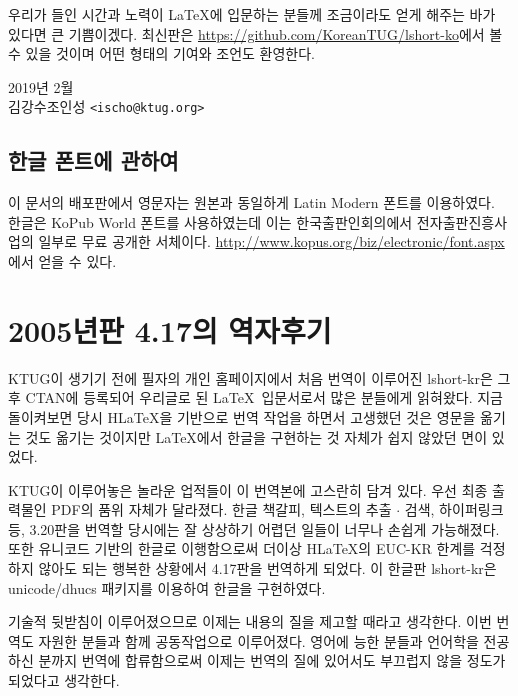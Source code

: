 우리가 들인 시간과 노력이 \LaTeX 에 입문하는 분들께 조금이라도 얻게 해주는 바가 있다면 
큰 기쁨이겠다. 
최신판은 \url{https://github.com/KoreanTUG/lshort-ko}에서 볼 수 있을 것이며
어떤 형태의 기여와 조언도 환영한다.

{\flushright 2019년 2월 \\
김강수\cntrdot 조인성 \texttt{<ischo@ktug.org>} \par
}


\subsection*{한글 폰트에 관하여}

이 문서의 배포판에서 영문자는 원본과 동일하게 Latin Modern 폰트를 이용하였다.
한글은 KoPub World 폰트를 사용하였는데 이는 한국출판인회의에서 전자출판진흥사업의 일부로 
무료 공개한 서체이다. \url{http://www.kopus.org/biz/electronic/font.aspx}에서 
얻을 수 있다.

\section*{2005년판 4.17의 역자후기}

KTUG이 생기기 전에 필자의 개인 홈페이지에서 처음 번역이 이루어진 lshort-kr은
그 후 CTAN에 등록되어 우리글로 된 \LaTeX\ 입문서로서 많은 분들에게 읽혀왔다.
지금 돌이켜보면 당시 H\LaTeX 을 기반으로 번역 작업을 하면서 고생했던 것은
영문을 옮기는 것도 옮기는 것이지만 \LaTeX 에서 한글을 구현하는 것 자체가
쉽지 않았던 면이 있었다.

KTUG이 이루어놓은 놀라운 업적들이 이 번역본에 고스란히 담겨 있다. 우선 
최종 출력물인 PDF의 품위 자체가 달라졌다. 한글 책갈피, 텍스트의 추출 $\cdot$
검색, 하이퍼링크 등, 3.20판을 번역할 당시에는 잘 상상하기 어렵던 일들이
너무나 손쉽게 가능해졌다. 또한 유니코드 기반의 한글로 이행함으로써
더이상 H\LaTeX 의 EUC-KR 한계를 걱정하지 않아도 되는 행복한 상황에서
4.17판을 번역하게 되었다. 이 한글판 lshort-kr은 \textsf{unicode/dhucs} 패키지를
이용하여 한글을 구현하였다.

기술적 뒷받침이 이루어졌으므로 이제는 내용의 질을 제고할 때라고 생각한다.
이번 번역도 자원한 분들과 함께 공동작업으로 이루어졌다. 영어에 능한
분들과 언어학을 전공하신 분까지 번역에 합류함으로써 이제는 번역의 질에
있어서도 부끄럽지 않을 정도가 되었다고 생각한다.

